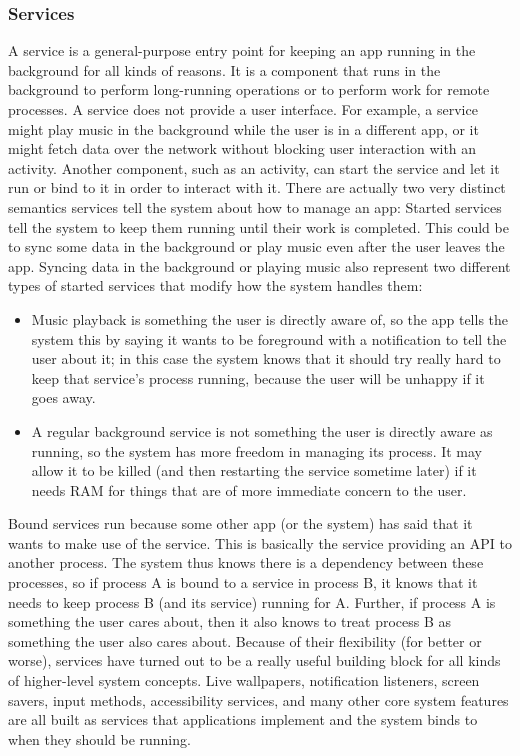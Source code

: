 \documentclass[14pt]{report}
\begin{document}
				\subsubsection{Services}
					A service is a general-purpose entry point for keeping an app running in the background for all kinds of reasons. It is a component that runs in the background to perform long-running operations or to perform work for remote processes. A service does not provide a user interface. For example, a service might play music in the background while the user is in a different app, or it might fetch data over the network without blocking user interaction with an activity. Another component, such as an activity, can start the service and let it run or bind to it in order to interact with it. There are actually two very distinct semantics services tell the system about how to manage an app: Started services tell the system to keep them running until their work is completed. This could be to sync some data in the background or play music even after the user leaves the app. Syncing data in the background or playing music also represent two different types of started services that modify how the system handles them:
					\begin{itemize}
						\item Music playback is something the user is directly aware of, so the app tells the system this by saying it wants to be foreground with a notification to tell the user about it; in this case the system knows that it should try really hard to keep that service's process running, because the user will be unhappy if it goes away.
						\item A regular background service is not something the user is directly aware as running, so the system has more freedom in managing its process. It may allow it to be killed (and then restarting the service sometime later) if it needs RAM for things that are of more immediate concern to the user.
					\end{itemize}	

					Bound services run because some other app (or the system) has said that it wants to make use of the service. This is basically the service providing an API to another process. The system thus knows there is a dependency between these processes, so if process A is bound to a service in process B, it knows that it needs to keep process B (and its service) running for A. Further, if process A is something the user cares about, then it also knows to treat process B as something the user also cares about. Because of their flexibility (for better or worse), services have turned out to be a really useful building block for all kinds of higher-level system concepts. Live wallpapers, notification listeners, screen savers, input methods, accessibility services, and many other core system features are all built as services that applications implement and the system binds to when they should be running.\\
\end{document}
